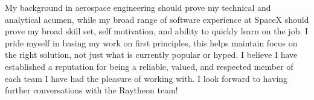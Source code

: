 \begin{cvletter}

My background in aerospace engineering should prove my technical and analytical
acumen, while my broad range of software experience at SpaceX should prove my
broad skill set, self motivation, and ability to quickly learn on the job. I
pride myself in basing my work on first principles, this helps maintain focus on
the right solution, not just what is currently popular or hyped. I believe I
have established a reputation for being a reliable, valued, and respected member
of each team I have had the pleasure of working with. I look forward to having
further conversations with the Raytheon team!


\end{cvletter}

